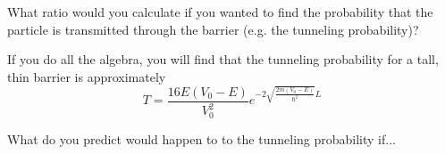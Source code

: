 \begin{questions}
		
		\question What ratio would you calculate if you wanted to find the probability that the particle is transmitted through the barrier (e.g. the tunneling probability)?
				
					\begin{solution}[1.5in]
					\end{solution}
		
		\question If you do all the algebra, you will find that the tunneling probability for a tall, thin barrier is approximately
			\begin{equation*}
				T = \frac{16E(V_0-E)}{V_0^2} e^{-2\sqrt{\frac{2m(V_0-E)}{\hbar^2}}L}
			\end{equation*}
			
			What do you predict would happen to to the tunneling probability if...
	\end{questions}	
	
	\stophere